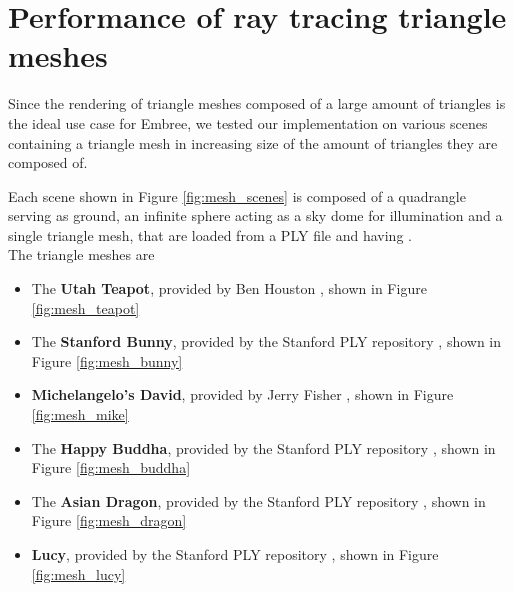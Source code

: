 \section{Performance of ray tracing triangle meshes}
\label{sec:result_meshes}

Since the rendering of triangle meshes composed of a large amount of triangles is the ideal use case for Embree, we tested our implementation on various scenes containing a triangle mesh in increasing size of the amount of triangles they are composed of.

Each scene shown in Figure \ref{fig:mesh_scenes} is composed of a quadrangle serving as ground, an infinite sphere acting as a sky dome for illumination and a single triangle mesh, that are loaded from a PLY file and having . 
\\

\noindent The triangle meshes are 
\begin{itemize}
	\setlength\itemsep{0.05em}
	
	\item The \textbf{Utah Teapot}, provided by Ben Houston \cite{teapot}, shown in Figure \ref{fig:mesh_teapot}
	\item The \textbf{Stanford Bunny}, provided by the Stanford PLY repository \cite{plyRepo}, shown in Figure \ref{fig:mesh_bunny}
	\item \textbf{Michelangelo's David}, provided by Jerry Fisher \cite{david}, shown in Figure \ref{fig:mesh_mike}
	\item The \textbf{Happy Buddha}, provided by the Stanford PLY repository \cite{plyRepo}, shown in Figure \ref{fig:mesh_buddha}
	\item The \textbf{Asian Dragon}, provided by the Stanford PLY repository \cite{plyRepo}, shown in Figure \ref{fig:mesh_dragon}
	\item \textbf{Lucy}, provided by the Stanford PLY repository \cite{plyRepo}, shown in Figure \ref{fig:mesh_lucy}
\end{itemize}


